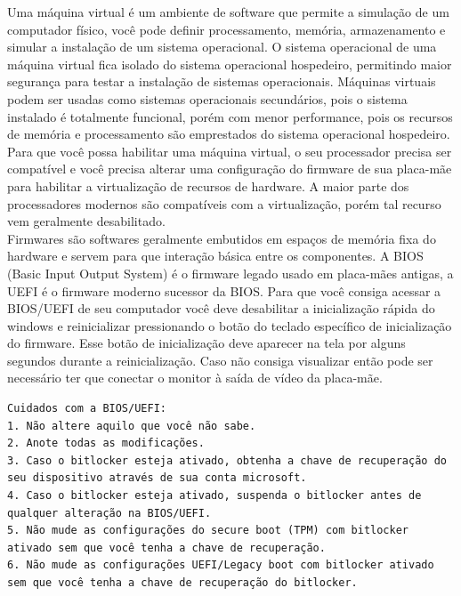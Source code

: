 \documentclass[12pt,a4paper]{article}
\begin{document}
\vspace{\baselineskip}

Uma máquina virtual é um ambiente de software que permite a simulação de um computador físico, você pode definir processamento, memória, armazenamento e simular a instalação de um sistema operacional. O sistema operacional de uma máquina virtual fica isolado do sistema operacional hospedeiro, permitindo maior segurança para testar a instalação de sistemas operacionais. Máquinas virtuais podem ser usadas como sistemas operacionais secundários, pois o sistema instalado é totalmente funcional, porém com menor performance, pois os recursos de memória e processamento são emprestados do sistema operacional hospedeiro. \\

Para que você possa habilitar uma máquina virtual, o seu processador precisa ser compatível e você precisa alterar uma configuração do firmware de sua placa-mãe para habilitar a virtualização de recursos de hardware. A maior parte dos processadores modernos são compatíveis com a virtualização, porém tal recurso vem geralmente desabilitado.\\

Firmwares são softwares geralmente embutidos em espaços de memória fixa do hardware e servem para que interação básica entre os componentes. A BIOS (Basic Input Output System) é o firmware legado usado em placa-mães antigas, a UEFI é o firmware moderno sucessor da BIOS. Para que você consiga acessar a BIOS/UEFI de seu computador você deve desabilitar a inicialização rápida do windows e reinicializar pressionando o botão do teclado específico de inicialização do firmware. Esse botão de inicialização deve aparecer na tela por alguns segundos durante a reinicialização. Caso não consiga visualizar então pode ser necessário ter que conectar o monitor à saída de vídeo da placa-mãe.\\

\begin{lstlisting}
Cuidados com a BIOS/UEFI:
1. Não altere aquilo que você não sabe.
2. Anote todas as modificações.
3. Caso o bitlocker esteja ativado, obtenha a chave de recuperação do seu dispositivo através de sua conta microsoft. 
4. Caso o bitlocker esteja ativado, suspenda o bitlocker antes de qualquer alteração na BIOS/UEFI.
5. Não mude as configurações do secure boot (TPM) com bitlocker ativado sem que você tenha a chave de recuperação.
6. Não mude as configurações UEFI/Legacy boot com bitlocker ativado sem que você tenha a chave de recuperação do bitlocker.
\end{lstlisting}
\end{document}
